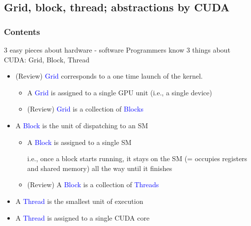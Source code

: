 \documentclass[dvipdfmx, 11pt, aspectratio=169]{beamer}   %
\begin{document}
\subsection{Grid, block, thread; abstractions by CUDA}
\begin{frame}
    \frametitle{Contents}
    \linespread{0.6}\selectfont
\end{frame}
\begin{frame}{3 easy pieces about hardware - software}
Programmers know 3 things about CUDA: Grid, Block, Thread
  \begin{itemize}
    \item (Review) \textcolor{blue}{Grid} corresponds to a one time launch of the kernel.
    \begin{itemize}
      \item A \textcolor{blue}{Grid} is assigned to a single GPU unit (i.e., a single device)
      \item (Review) \textcolor{blue}{Grid} is a collection of \textcolor{blue}{Blocks}
    \end{itemize}
    \item A \textcolor{blue}{Block} is the unit of dispatching to an SM
    \begin{itemize}
      \item A \textcolor{blue}{Block} is assigned to a single SM 
      
      i.e., once a block starts running, it stays on the SM (= occupies registers and shared memory) all the way until it finishes
      \item (Review) A \textcolor{blue}{Block} is a collection of \textcolor{blue}{Threads}
    \end{itemize}
    \item A \textcolor{blue}{Thread} is the smallest unit of execution
    \item A \textcolor{blue}{Thread} is assigned to a single CUDA core
  \end{itemize}
\end{frame}
\end{document}
